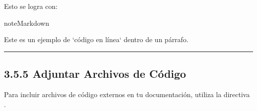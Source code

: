 \documentclass[a4paper,10pt,spanish]{sphinxmanual}
\begin{document}
\sphinxAtStartPar
Esto se logra con:

\begin{sphinxadmonition}{note}{Markdown}

\begin{sphinxVerbatim}[commandchars=\\\{\}]
Este es un ejemplo de `código en línea` dentro de un párrafo.
\end{sphinxVerbatim}
\end{sphinxadmonition}


\bigskip\hrule\bigskip



\subsection{3.5.5 Adjuntar Archivos de Código}
\label{\detokenize{3_guia_myst/code_api:adjuntar-archivos-de-codigo}}
\sphinxAtStartPar
Para incluir archivos de código externos en tu documentación, utiliza la directiva .
\end{document}
